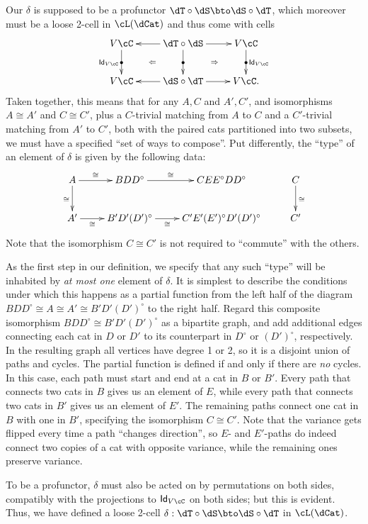 \documentclass{amsart}
\let\oc\circ
\newcommand{\C}{\cC}
\newcommand{\hunit}[1]{\Id_{#1}}
\newcommand{\dl}{\delta}
\renewcommand{\o}{^{\circ}}
\newcommand{\Id}{\mathsf{Id}}
\begin{document}
Our $\delta$ is supposed to be a profunctor $\dT \oc \dS \bto \dS \oc \dT$, which moreover must be a loose 2-cell in $\cL(\dCat)$ and thus come with cells
\[ \xymatrix{ V\C \ar[d]|{\bullet}_{\hunit {V\C}} \ar@{}[dr]|{\Leftarrow} &
  \dT\oc \dS \ar[l] \ar[d]|{\bullet} \ar[r] \ar@{}[dr]|{\Rightarrow} &
  V\C \ar[d]|{\bullet}^{\hunit {V\C}}\\
  V\C & \dS\oc\dT \ar[l] \ar[r] & V\C. } \]
Taken together, this means that for any $A,C$ and $A',C'$, and isomorphisms $A\cong A'$ and $C\cong C'$, plus a $C$-trivial matching from $A$ to $C$ and a $C'$-trivial matching from $A'$ to $C'$, both with the paired cats partitioned into two subsets, we must have a specified ``set of ways to compose''.
Put differently, the ``type'' of an element of $\dl$ is given by the following data:
\begin{equation}
  \xymatrix{ A \ar[d]_\cong \ar[r]^-\cong & B D D\o \ar[r]^-\cong & C E E\o D D\o & C \ar[d]^\cong \\
    A' \ar[r]_-\cong & B' D' (D')\o \ar[r]_-\cong & C' E' (E')\o D' (D')\o & C' }\label{eq:dl-type-1}
\end{equation}
Note that the isomorphism $C\cong C'$ is not required to ``commute'' with the others.

As the first step in our definition, we specify that any such ``type'' will be inhabited by \emph{at most one} element of $\dl$.
It is simplest to describe the conditions under which this happens as a partial function from the left half of the diagram $B D D\o \cong A\cong A' \cong B' D' (D')\o$ to the right half.
Regard this composite isomorphism $B D D\o \cong B' D' (D')\o$ as a bipartite graph, and add additional edges connecting each cat in $D$ or $D'$ to its counterpart in $D\o$ or $(D')\o$, respectively.
In the resulting graph all vertices have degree 1 or 2, so it is a disjoint union of paths and cycles.
The partial function is defined if and only if there are \emph{no} cycles.
In this case, each path must start and end at a cat in $B$ or $B'$.
Every path that connects two cats in $B$ gives us an element of $E$, while every path that connects two cats in $B'$ gives us an element of $E'$.
The remaining paths connect one cat in $B$ with one in $B'$, specifying the isomorphism $C\cong C'$.
Note that the variance gets flipped every time a path ``changes direction'', so $E$- and $E'$-paths do indeed connect two copies of a cat with opposite variance, while the remaining ones preserve variance.

To be a profunctor, $\dl$ must also be acted on by permutations on both sides, compatibly with the projections to $\hunit{V\C}$ on both sides; but this is evident.
Thus, we have defined a loose 2-cell $\dl : \dT \oc \dS \bto \dS \oc \dT$ in $\cL(\dCat)$.
\end{document}
